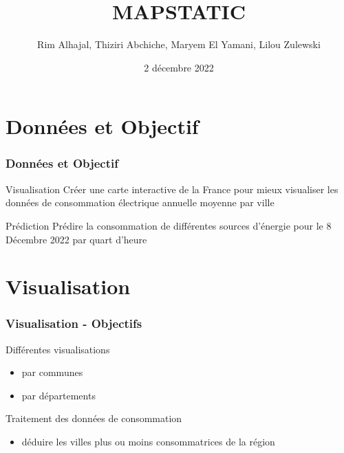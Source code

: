 \documentclass{beamer}
\title[Développement Logiciel]{MAPSTATIC}
\author[]{Rim Alhajal, Thiziri Abchiche, Maryem El Yamani, Lilou Zulewski}
\institute{M1 - SSD}
\date{2 décembre 2022}
\begin{document}
\maketitle



\section{Données et Objectif}

\begin{frame}
\frametitle{Données et Objectif}
\begin{block}{Visualisation}
Créer une carte interactive de la France pour mieux visualiser les données de consommation électrique annuelle moyenne par ville
\end{block}
\begin{block}{Prédiction}
Prédire la consommation de différentes sources d'énergie pour le 8 Décembre 2022 par quart d'heure
\end{block}
\end{frame}



\section{Visualisation}

\begin{frame}
\frametitle{Visualisation - Objectifs}
\begin{block}{Différentes visualisations}
\begin{itemize}
    \item par communes \\
    \item par départements \\
\end{itemize}
\end{block}
\begin{block}{Traitement des données de consommation}
\begin{itemize}
    \item déduire les villes plus ou moins consommatrices de la région
\end{itemize}
\end{block}
\end{frame}
\end{document}
